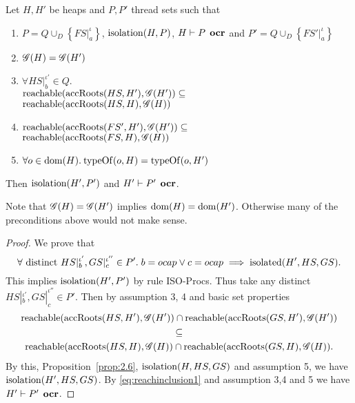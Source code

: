 \begin{proposition} \label{prop:2.11}
  Let $H, H'$ be heaps and $P, P'$ thread sets such that
  \begin{enumerate}
    \item $P = Q \cup_D \left\{ FS|_a^\iota \right\}$, $\mbox{$\mathrm{isolation}$}{(H, P)}$, $H
      \vdash P \:\: \mbox{\bf ocr}$ and $P' = Q \cup_D \left\{ FS'|_a^\iota \right\}$
    \item $\mathscr{G}{(H)} = \mathscr{G}{(H')}$
    \item $\forall HS|_b^{\iota'} \in Q.$ \\ 
      $\mbox{$\mathrm{reachable}$}{(\mbox{$\mathrm{accRoots}$}{(HS, H')}, \ensuremath{\mathscr{G}}{(H')})} \subseteq$ \\
      $\mbox{$\mathrm{reachable}$}{(\mbox{$\mathrm{accRoots}$}{(HS, H)}, \ensuremath{\mathscr{G}}{(H)})}$
    \item $\mbox{$\mathrm{reachable}$}{(\mbox{$\mathrm{accRoots}$}{(FS', H')}, \ensuremath{\mathscr{G}}{(H')})} \subseteq$ \\
      $\mbox{$\mathrm{reachable}$}{(\mbox{$\mathrm{accRoots}$}{(FS, H)}, \ensuremath{\mathscr{G}}{(H)})}$
    \item $\forall o \in \mbox{$\mathrm{dom}$}{(H)}. \: \mbox{$\mathrm{typeOf}$}{(o, H)} = \mbox{$\mathrm{typeOf}$}{(o, H')}$
  \end{enumerate}
  Then $\mbox{$\mathrm{isolation}$}{(H', P')}$ and $H' \vdash P' \:\: \mbox{\bf ocr}$.
\end{proposition}

\begin{remark}
  Note that $\mathscr{G}{(H)} = \mathscr{G}{(H')}$ implies $\mbox{$\mathrm{dom}$}{(H)} = \mbox{$\mathrm{dom}$}{(H')}$.
  Otherwise many of the preconditions above would not make sense.
\end{remark}

\begin{proof}
  We prove that 
  \begin{equation*}
    \forall \text{ distinct } HS|_b^{\iota'}, GS|_c^{\iota''} \in P'.\; b = \mbox{$ocap$} \lor c = \mbox{$ocap$} \implies
    \mbox{$\mathrm{isolated}$}(H', HS, GS).
  \end{equation*}
  This implies $\mbox{$\mathrm{isolation}$}(H', P')$ by rule {\sc ISO-Procs}.
  Thus take any distinct $HS|_b^{\iota'}, GS|_c^{\iota''} \in P'$. Then by assumption 3, 4 and basic set
  properties
  \begin{equation} \label{eq:reachinclusion1}
    \begin{gathered}
      \mbox{$\mathrm{reachable}$}(\mbox{$\mathrm{accRoots}$}(HS, H'), \mathscr{G}(H')) \cap \mbox{$\mathrm{reachable}$}(\mbox{$\mathrm{accRoots}$}(GS, H'),
      \mathscr{G}(H')) \\
      \subseteq \\
      \mbox{$\mathrm{reachable}$}(\mbox{$\mathrm{accRoots}$}(HS, H), \mathscr{G}(H)) \cap \mbox{$\mathrm{reachable}$}(\mbox{$\mathrm{accRoots}$}(GS, H),
      \mathscr{G}(H)).
    \end{gathered}
  \end{equation}
  By this, Proposition~\ref{prop:2.6}, $\mbox{$\mathrm{isolation}$}(H, HS, GS)$ and assumption 5, we have
  $\mbox{$\mathrm{isolation}$}(H', HS, GS)$. By \eqref{eq:reachinclusion1} and assumption 3,4 and 5
  we have $H' \vdash P' \:\: \mbox{\bf ocr}$.
\end{proof}

